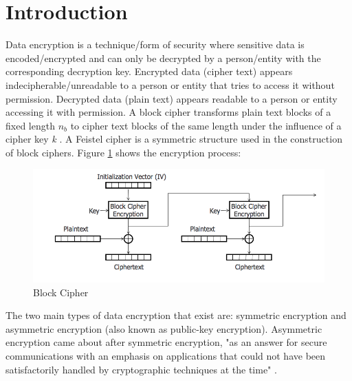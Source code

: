 \documentclass[journal]{IEEEtran}
\begin{document}
\section{\textbf{Introduction}}
Data encryption is a technique/form of security where sensitive data is encoded/encrypted and can only be decrypted by a person/entity with the corresponding decryption key. Encrypted data (cipher text) appears indecipherable/unreadable to a person or entity that tries to access it without permission. Decrypted data (plain text) appears readable to a person or entity accessing it with permission. A block cipher transforms plain text blocks of a fixed length \textit{${n_b}$} to cipher text blocks of the same length under the influence of a cipher key \textit{k} \cite{block_cipher}. A Feistel cipher is a symmetric structure used in the construction of block ciphers. Figure \ref{fig:block_cipher} shows the encryption process:

\newline
\begin{figure}[!hb]
    \centering
    \includegraphics[scale=.3]{block_cipher}
    \caption{Block Cipher}
    \label{fig:block_cipher}
\end{figure}

The two main types of data encryption that exist are: symmetric encryption and asymmetric encryption (also known as public-key encryption). Asymmetric encryption came about after symmetric encryption, "as an answer for secure communications with an emphasis on applications that could not have been satisfactorily handled by cryptographic techniques at the time" \cite{asymm_symm}.
\end{document}
